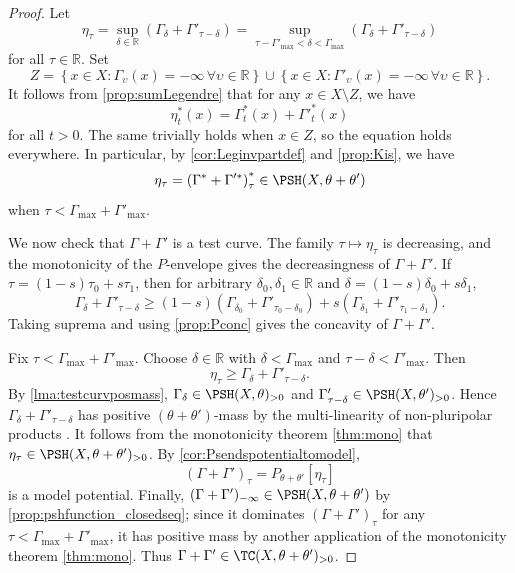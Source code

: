 \begin{proof}
    Let
    \[
    \eta_{\tau}=\sup_{\delta\in \mathbb{R}} \left(\Gamma_\delta+\Gamma'_{\tau-\delta}\right)=\sup_{\tau-\Gamma'_{\max}<\delta<\Gamma_{\max}}\left(\Gamma_\delta+\Gamma'_{\tau-\delta}\right)
    \]
    for all $\tau\in \mathbb{R}$.
    Set
    \[
    Z=\left\{x\in X: \Gamma_{\upsilon}(x)=-\infty \,\forall \upsilon\in \mathbb{R}\right\}\cup \left\{x\in X: \Gamma'_{\upsilon}(x)=-\infty \,\forall \upsilon\in \mathbb{R}\right\}.
    \]
    It follows from \cref{prop:sumLegendre} that for any $x\in X\setminus Z$, we have
    \[
    \eta^*_t(x)=\Gamma^*_t(x)+\Gamma'^*_t(x)
    \]
    for all $t>0$.
    The same trivially holds when $x\in Z$, so the equation holds everywhere. In particular, by \cref{cor:Leginvpartdef} and \cref{prop:Kis}, we have
    \[
    \eta_{\tau}=\left(\Gamma^*+\Gamma'^*\right)^*_{\tau}\in \PSH(X,\theta+\theta')
    \]
    when $\tau<\Gamma_{\max}+\Gamma'_{\max}$.

    We now check that $\Gamma+\Gamma'$ is a test curve. The family $\tau\mapsto\eta_\tau$ is decreasing, and the monotonicity of the $P$-envelope  gives the decreasingness of $\Gamma+\Gamma'$. If $\tau=(1-s)\tau_0+s\tau_1$, then for arbitrary $\delta_0,\delta_1\in \mathbb{R}$ and $\delta=(1-s)\delta_0+s\delta_1$,
    \[
    \Gamma_\delta+\Gamma'_{\tau-\delta}\geq (1-s)(\Gamma_{\delta_0}+\Gamma'_{\tau_0-\delta_0})+s(\Gamma_{\delta_1}+\Gamma'_{\tau_1-\delta_1}).
    \]
    Taking suprema and using \cref{prop:Pconc} gives the concavity of $\Gamma+\Gamma'$.

    Fix $\tau<\Gamma_{\max}+\Gamma'_{\max}$. Choose $\delta\in \mathbb{R}$ with $\delta<\Gamma_{\max}$ and $\tau-\delta<\Gamma'_{\max}$. Then
    \[
    \eta_\tau\geq \Gamma_\delta+\Gamma'_{\tau-\delta}.
    \]
    By \cref{lma:testcurvposmass}, $\Gamma_\delta\in \PSH(X,\theta)_{>0}$ and $\Gamma'_{\tau-\delta}\in \PSH(X,\theta')_{>0}$. Hence $\Gamma_\delta+\Gamma'_{\tau-\delta}$ has positive $(\theta+\theta')$-mass by the multi-linearity of non-pluripolar products . It follows from the monotonicity theorem \cref{thm:mono} that $\eta_\tau\in \PSH(X,\theta+\theta')_{>0}$. By \cref{cor:Psendspotentialtomodel},
    \[
        (\Gamma+\Gamma')_\tau=P_{\theta+\theta'}[\eta_\tau]
    \]
    is a model potential. Finally, $(\Gamma+\Gamma')_{-\infty}\in \PSH(X,\theta+\theta')$ by \cref{prop:pshfunction_closedseq}; since it dominates $(\Gamma+\Gamma')_\tau$ for any $\tau<\Gamma_{\max}+\Gamma'_{\max}$, it has positive mass by another application of the monotonicity theorem \cref{thm:mono}. Thus $\Gamma+\Gamma'\in \TC(X,\theta+\theta')_{>0}$.


\end{proof}
